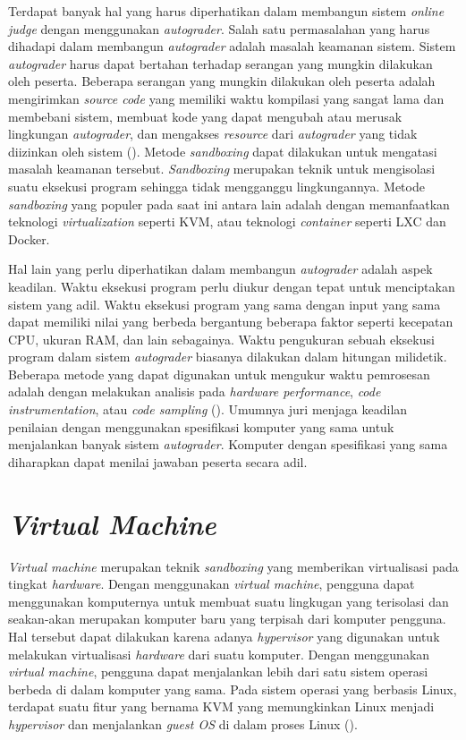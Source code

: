 \par Terdapat banyak hal yang harus diperhatikan dalam membangun sistem \textit{online judge} dengan menggunakan \textit{autograder}. Salah satu permasalahan yang harus dihadapi dalam membangun \textit{autograder} adalah masalah keamanan sistem. Sistem \textit{autograder} harus dapat bertahan terhadap serangan yang mungkin dilakukan oleh peserta. Beberapa serangan yang mungkin dilakukan oleh peserta adalah mengirimkan \textit{source code} yang memiliki waktu kompilasi yang sangat lama dan membebani sistem, membuat kode yang dapat mengubah atau merusak lingkungan \textit{autograder}, dan mengakses \textit{resource} dari \textit{autograder} yang tidak diizinkan oleh sistem (\cite{wasikojsurvey}). Metode \textit{sandboxing} dapat dilakukan untuk mengatasi masalah keamanan tersebut. \textit{Sandboxing} merupakan teknik untuk mengisolasi suatu eksekusi program sehingga tidak mengganggu lingkungannya. Metode \textit{sandboxing} yang populer pada saat ini antara lain adalah dengan memanfaatkan teknologi \textit{virtualization} seperti KVM, atau teknologi \textit{container} seperti LXC dan Docker.

\par Hal lain yang perlu diperhatikan dalam membangun \textit{autograder} adalah aspek keadilan. Waktu eksekusi program perlu diukur dengan tepat untuk menciptakan sistem yang adil. Waktu eksekusi program yang sama dengan input yang sama dapat memiliki nilai yang berbeda bergantung beberapa faktor seperti kecepatan CPU, ukuran RAM, dan lain sebagainya. Waktu pengukuran sebuah eksekusi program dalam sistem \textit{autograder} biasanya dilakukan dalam hitungan milidetik. Beberapa metode yang dapat digunakan untuk mengukur waktu pemrosesan adalah dengan melakukan analisis pada \textit{hardware performance}, \textit{code instrumentation}, atau \textit{code sampling} (\cite{wasikojsurvey}). Umumnya juri menjaga keadilan penilaian dengan menggunakan spesifikasi komputer yang sama untuk menjalankan banyak sistem \textit{autograder}. Komputer dengan spesifikasi yang sama diharapkan dapat menilai jawaban peserta secara adil.

\section{\textit{Virtual Machine}}

\par \textit{Virtual machine} merupakan teknik \textit{sandboxing} yang memberikan virtualisasi pada tingkat \textit{hardware}. Dengan menggunakan \textit{virtual machine}, pengguna dapat menggunakan komputernya untuk membuat suatu lingkugan yang terisolasi dan seakan-akan merupakan komputer baru yang terpisah dari komputer pengguna. Hal tersebut dapat dilakukan karena adanya \textit{hypervisor} yang digunakan untuk melakukan virtualisasi \textit{hardware} dari suatu komputer. Dengan menggunakan \textit{virtual machine}, pengguna dapat menjalankan lebih dari satu sistem operasi berbeda di dalam komputer yang sama. Pada sistem operasi yang berbasis Linux, terdapat suatu fitur yang bernama KVM yang memungkinkan Linux menjadi \textit{hypervisor} dan menjalankan \textit{guest OS} di dalam proses Linux (\cite{wfeltervmcontainer}).

